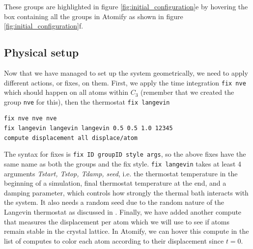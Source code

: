 \documentclass[12pt,a4paper,final]{iopart}
\newcommand{\code}[1]{\colorbox{light-gray}{\color{RawSienna}\texttt{#1}}}
\begin{document}
These groups are highlighted in figure \ref{fig:initial_configuration}e by hovering the
box containing all the groups in Atomify as shown in figure \ref{fig:initial_configuration}f.

\subsection{Physical setup}
Now that we have managed to set up the system geometrically, 
we need to apply different actions, or fixes, on them.
First, we apply the time integration \code{fix nve} which
should happen on all atoms within $C_3$ (remember that we created the group \code{nve} for this),
then the thermostat \code{fix langevin}

\begin{lstlisting}
fix nve nve nve
fix langevin langevin langevin 0.5 0.5 1.0 12345
compute displacement all displace/atom
\end{lstlisting}

The syntax for fixes is \code{fix ID groupID style args}, so the above fixes have the same name as both the groups and the fix style.
\code{fix langevin} takes at least 4 arguments \textit{Tstart, Tstop, Tdamp, seed}, i.e.
the thermostat temperature in the beginning of a simulation, final thermostat temperature at the end, and a damping parameter, which controls how strongly the thermal bath interacts with the system.
It also needs a random seed due to the random nature of the Langevin thermostat as discussed in \cite{schneider1978molecular}.
Finally, we have added another compute that measures the displacement per atom which we will use to see if atoms remain stable in the crystal lattice.
In Atomify, we can hover this compute in the list of computes to color each atom according to their displacement since $t=0$.
\end{document}
